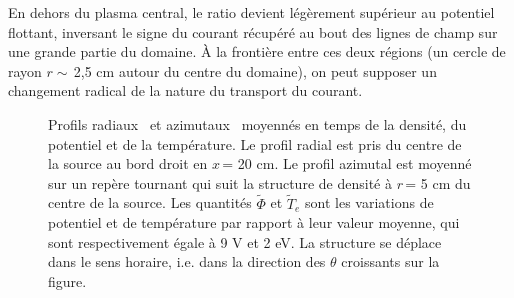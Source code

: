 \begin{refsection}
En dehors du plasma central, le ratio devient légèrement supérieur
au potentiel flottant, inversant le signe du courant récupéré au bout des lignes
de champ sur une grande partie du domaine. À la frontière entre ces
deux régions (un cercle de rayon $r\sim\,$2,5 cm autour du centre du domaine),
on peut supposer un changement radical de la nature du transport du courant.

\begin{figure}[!htbp]
  \centering
    \caption{Profils radiaux~ et
    azimutaux~ moyennés en temps de la densité, du
    potentiel et de la température. Le profil radial est pris du centre de la source au bord droit
    en $x\,$= 20 cm. Le profil azimutal est moyenné sur un repère tournant qui
    suit la structure de densité à $r\,$= 5 cm du centre de la source. Les
    quantités $\tilde{\Phi}$ et $\tilde{T}_e$ sont les variations de potentiel et de température par rapport à leur valeur
    moyenne, qui sont respectivement égale à 9 V et 2 eV. La structure se
    déplace dans le sens horaire, i.e. dans la direction des $\theta$ croissants
    sur la figure.}
    \label{4-CybeleProfils}
\end{figure}


\end{refsection}
